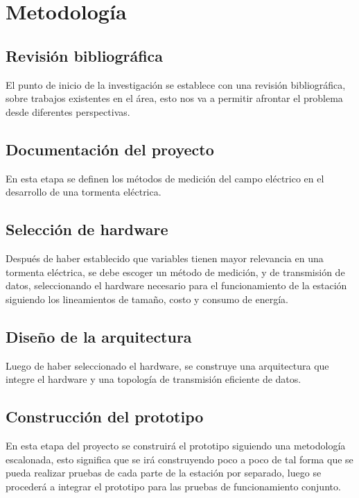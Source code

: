 \documentclass[12pt,a4paper,oneside]{book}
\begin{document}
\newpage 

\chapter{Metodología}

\section{\textbf{Revisión bibliográfica}}
El punto de inicio de la investigación se establece con una revisión bibliográfica, sobre trabajos existentes en el área, esto nos va a permitir afrontar el problema desde diferentes perspectivas. 
\section{\textbf{Documentación del proyecto}}
En esta etapa se definen los métodos de medición del campo eléctrico en el desarrollo de una tormenta eléctrica. 
\section{\textbf{Selección de hardware}}
Después de haber establecido que variables tienen mayor relevancia en una tormenta eléctrica, se debe escoger un método de medición, y de transmisión de datos, seleccionando el hardware necesario para el funcionamiento de la estación siguiendo los lineamientos de tamaño, costo y consumo de energía.

\section{\textbf{Diseño de la arquitectura}}
Luego de haber seleccionado el hardware, se construye una arquitectura que integre el hardware y una topología de transmisión eficiente de datos. 
\section{\textbf{Construcción del prototipo}}
En esta etapa del proyecto se construirá el prototipo siguiendo una metodología escalonada, esto significa que se irá construyendo poco a poco de tal forma que se pueda realizar pruebas de cada parte de la estación por separado, luego se procederá a integrar el prototipo para las pruebas de funcionamiento conjunto. 

\end{document}
